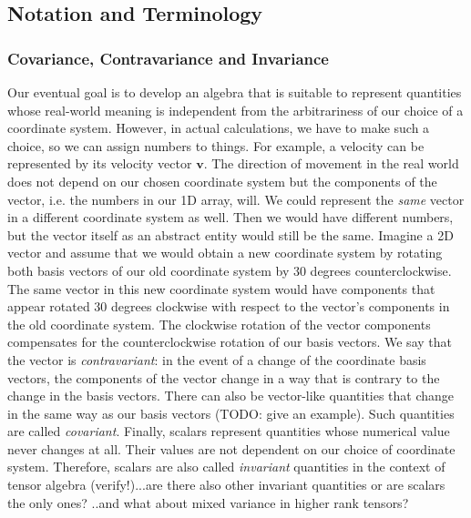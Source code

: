 \subsection{Notation and Terminology}

\subsubsection{Covariance, Contravariance and Invariance}
Our eventual goal is to develop an algebra that is suitable to represent quantities whose real-world meaning is independent from the arbitrariness of our choice of a coordinate system. However, in actual calculations, we have to make such a choice, so we can assign numbers to things. For example, a velocity can be represented by its velocity vector $\mathbf{v}$. The direction of movement in the real world does not depend on our chosen coordinate system but the components of the vector, i.e. the numbers in our 1D array, will. We could represent the \emph{same} vector in a different coordinate system as well. Then we would have different numbers, but the vector itself as an abstract entity would still be the same. Imagine a 2D vector and assume that we would obtain a new coordinate system by rotating both basis vectors of our old coordinate system by 30 degrees counterclockwise. The same vector in this new coordinate system would have components that appear rotated 30 degrees clockwise with respect to the vector's components in the old coordinate system. The clockwise rotation of the vector components compensates for the counterclockwise rotation of our basis vectors. We say that the vector is \emph{contravariant}: in the event of a change of the coordinate basis vectors, the components of the vector change in a way that is contrary to the change in the basis vectors. There can also be vector-like quantities that change in the same way as our basis vectors (TODO: give an example). Such quantities are called \emph{covariant}. Finally, scalars represent quantities whose numerical value never changes at all. Their values are not dependent on our choice of coordinate system. Therefore, scalars are also called \emph{invariant} quantities in the context of tensor algebra (verify!)...are there also other invariant quantities or are scalars the only ones? ..and what about mixed variance in higher rank tensors?


